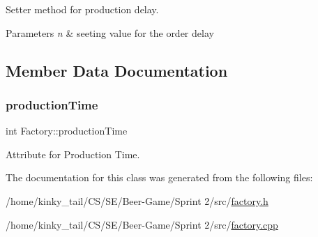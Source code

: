 Setter method for production delay. 


\begin{DoxyParams}{Parameters}
{\em n} & seeting value for the order delay \\
\hline
\end{DoxyParams}


\subsection{Member Data Documentation}
\mbox{\label{class_factory_ab3a36b3ceb997d9e3fcc534c45fef354}} 
\subsubsection{\texorpdfstring{production\+Time}{productionTime}}
{\footnotesize\ttfamily int Factory\+::production\+Time\hspace{0.3cm}{\ttfamily [private]}}



Attribute for Production Time. 



The documentation for this class was generated from the following files\+:\begin{DoxyCompactItemize}
\item 
/home/kinky\+\_\+tail/\+C\+S/\+S\+E/\+Beer-\/\+Game/\+Sprint 2/src/\hyperlink{factory_8h}{factory.\+h}\item 
/home/kinky\+\_\+tail/\+C\+S/\+S\+E/\+Beer-\/\+Game/\+Sprint 2/src/\hyperlink{factory_8cpp}{factory.\+cpp}\end{DoxyCompactItemize}
